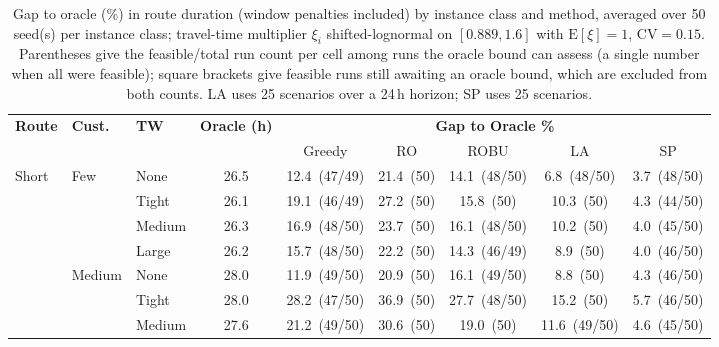 \begin{table}[htbp]
\centering
\caption{Gap to oracle (\%) in route duration (window penalties included) by instance class and method, averaged over 50 seed(s) per instance class; travel-time multiplier $\xi_i$ shifted-lognormal on $[0.889, 1.6]$ with $\mathrm{E}[\xi]=1$, $\mathrm{CV} = 0.15$.  Parentheses give the feasible/total run count per cell among runs the oracle bound can assess (a single number when all were feasible); square brackets give feasible runs still awaiting an oracle bound, which are excluded from both counts.  LA uses 25 scenarios over a 24\,h horizon; SP uses 25 scenarios.}
\label{tab:gap}
\begin{tabular}{lll c ccccc}
\toprule
\multirow{2}{*}{\textbf{\small Route}} & \multirow{2}{*}{\textbf{\small Cust.}} & \multirow{2}{*}{\textbf{\small TW}} & \multirow{2}{*}{\textbf{Oracle (h)}} &
\multicolumn{5}{c}{\textbf{Gap to Oracle \%}} \\
\cmidrule(lr){5-9}
 & & & & Greedy & RO & ROBU & LA & SP \\
\midrule
\multirow{12}{*}{\small Short} & \multirow{4}{*}{\small Few} & {\small None} & 26.5 & 12.4~{\scriptsize(47/49)} & 21.4~{\scriptsize(50)} & 14.1~{\scriptsize(48/50)} & 6.8~{\scriptsize(48/50)} & 3.7~{\scriptsize(48/50)} \\
 &  & {\small Tight} & 26.1 & 19.1~{\scriptsize(46/49)} & 27.2~{\scriptsize(50)} & 15.8~{\scriptsize(50)} & 10.3~{\scriptsize(50)} & 4.3~{\scriptsize(44/50)} \\
 &  & {\small Medium} & 26.3 & 16.9~{\scriptsize(48/50)} & 23.7~{\scriptsize(50)} & 16.1~{\scriptsize(48/50)} & 10.2~{\scriptsize(50)} & 4.0~{\scriptsize(45/50)} \\
 &  & {\small Large} & 26.2 & 15.7~{\scriptsize(48/50)} & 22.2~{\scriptsize(50)} & 14.3~{\scriptsize(46/49)} & 8.9~{\scriptsize(50)} & 4.0~{\scriptsize(46/50)} \\
 & \multirow{4}{*}{\small Medium} & {\small None} & 28.0 & 11.9~{\scriptsize(49/50)} & 20.9~{\scriptsize(50)} & 16.1~{\scriptsize(49/50)} & 8.8~{\scriptsize(50)} & 4.3~{\scriptsize(46/50)} \\
 &  & {\small Tight} & 28.0 & 28.2~{\scriptsize(47/50)} & 36.9~{\scriptsize(50)} & 27.7~{\scriptsize(48/50)} & 15.2~{\scriptsize(50)} & 5.7~{\scriptsize(46/50)} \\
 &  & {\small Medium} & 27.6 & 21.2~{\scriptsize(49/50)} & 30.6~{\scriptsize(50)} & 19.0~{\scriptsize(50)} & 11.6~{\scriptsize(49/50)} & 4.6~{\scriptsize(45/50)} \\

\end{tabular}
\end{table}
